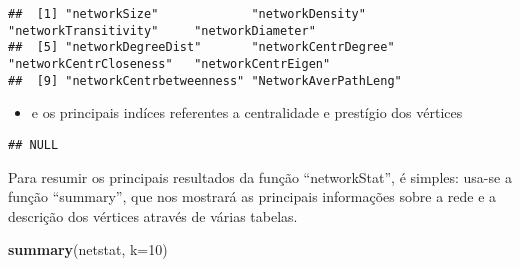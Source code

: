 \documentclass[]{article}
\newenvironment{Shaded}{\begin{snugshade}}{\end{snugshade}}
\newcommand{\DataTypeTok}[1]{\textcolor[rgb]{0.13,0.29,0.53}{#1}}
\newcommand{\DecValTok}[1]{\textcolor[rgb]{0.00,0.00,0.81}{#1}}
\newcommand{\KeywordTok}[1]{\textcolor[rgb]{0.13,0.29,0.53}{\textbf{#1}}}
\newcommand{\NormalTok}[1]{#1}
\newcommand{\OperatorTok}[1]{\textcolor[rgb]{0.81,0.36,0.00}{\textbf{#1}}}
\newcommand{\StringTok}[1]{\textcolor[rgb]{0.31,0.60,0.02}{#1}}
\providecommand{\tightlist}{%
  \setlength{\itemsep}{0pt}\setlength{\parskip}{0pt}}
\begin{document}
\begin{Shaded}
\end{Shaded}

\begin{verbatim}
##  [1] "networkSize"             "networkDensity"          "networkTransitivity"     "networkDiameter"        
##  [5] "networkDegreeDist"       "networkCentrDegree"      "networkCentrCloseness"   "networkCentrEigen"      
##  [9] "networkCentrbetweenness" "NetworkAverPathLeng"
\end{verbatim}

\begin{itemize}
\tightlist
\item
  e os principais indíces referentes a centralidade e prestígio dos
  vértices
\end{itemize}

\begin{Shaded}
\end{Shaded}

\begin{verbatim}
## NULL
\end{verbatim}

Para resumir os principais resultados da função ``networkStat'', é
simples: usa-se a função ``summary'', que nos mostrará as principais
informações sobre a rede e a descrição dos vértices através de várias
tabelas.

\begin{Shaded}
\begin{Highlighting}[]
\KeywordTok{summary}\NormalTok{(netstat, }\DataTypeTok{k=}\DecValTok{10}\NormalTok{)}
\end{Highlighting}
\end{Shaded}
\end{document}
